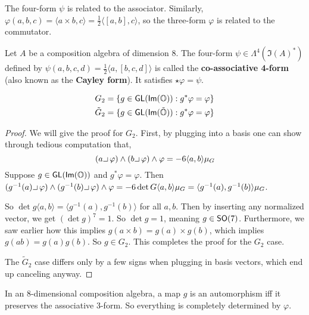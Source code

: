 \begin{remark*}
    The four-form $\psi$ is related to the associator. Similarly, $\varphi(a,b,c) = \langle a\times b,c\rangle = \frac{1}{2}\langle [a,b],c\rangle$, so the three-form $\varphi$ is related to the commutator.
\end{remark*}
\begin{defn}
    Let $A$ be a composition algebra of dimension 8. The four-form $\psi \in \Lambda^4(\Im(A)^*)$ defined by $\psi(a,b,c,d) = \frac{1}{2}\langle a,[b,c,d]\rangle$ is called the \textbf{co-associative 4-form} (also known as the \textbf{Cayley form}). It satisfies $\star\varphi = \psi$.
\end{defn}
\begin{thm}
\begin{align}
    G_2 &= \{g \in \operatorname{\textsf{GL}}(\textsf{Im}(\operatorname{\mathbb{O}})) : g^* \varphi = \varphi\}\\
    \tilde{G}_2 &= \{g\in \operatorname{\textsf{GL}}(\textsf{Im}(\tilde{\operatorname{\mathbb{O}}})) : g^*\varphi = \varphi\}
\end{align}    
\end{thm}
\begin{proof}
    We will give the proof for $G_2$. First, by plugging into a basis one can show through tedious computation that,
    \[(a\hk \varphi)\wedge (b\hk\varphi)\wedge\varphi = -6\langle a,b\rangle \mu_G\]
    Suppose $g \in \operatorname{\textsf{GL}}(\textsf{Im}(\operatorname{\mathbb{O}}))$ and $g^*\varphi = \varphi$. Then $(g^{-1}(a)\hk\varphi)\wedge(g^{-1}(b)\hk\varphi)\wedge\varphi = -6\det G\langle a,b\rangle \mu_G= \langle g^{-1}(a),g^{-1}(b)\rangle \mu_G$.

    So $\det g \langle a,b\rangle = \langle g^{-1}(a),g^{-1}(b)\rangle$ for all $a,b$. Then by inserting any normalized vector, we get $(\det g)^7 = 1$. So $\det g = 1$, meaning $g \in \operatorname{\textsf{SO}}(7)$. Furthermore, we saw earlier how this implies $g(a\times b)=g(a)\times g(b)$, which implies $g(ab)=g(a)g(b)$. So $g \in G_2$. This completes the proof for the $G_2$ case.

    The $\tilde{G}_2$ case differs only by a few signs when plugging in basis vectors, which end up canceling anyway.
\end{proof}
\begin{remark*}
    In an $8$-dimensional composition algebra, a map $g$ is an automorphism iff it preserves the associative 3-form. So everything is completely determined by $\varphi$.
\end{remark*}
